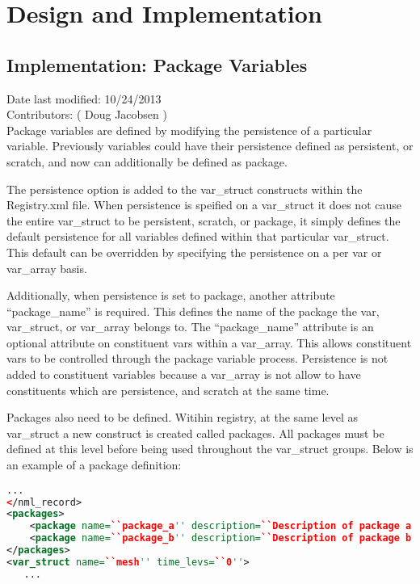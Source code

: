 \documentclass[11pt]{report}
\begin{document}

\chapter{Design and Implementation}
\section{Implementation: Package Variables}
Date last modified: 10/24/2013 \\
Contributors: ( Doug Jacobsen ) \\

Package variables are defined by modifying the persistence of a particular
variable. Previously variables could have their persistence defined as
persistent, or scratch, and now can additionally be defined as package.

The persistence option is added to the var\_struct constructs within the Registry.xml file. When persistence is
speified on a var\_struct it does not cause the entire var\_struct to be
persistent, scratch, or package, it simply defines the default persistence for
all variables defined within that particular var\_struct. This default can be
overridden by specifying the persistence on a per var or var\_array basis.

Additionally, when persistence is set to package, another attribute
``package\_name'' is required. This defines the name of the package the var,
var\_struct, or var\_array belongs to. The ``package\_name'' attribute is an
optional attribute on constituent vars within a var\_array. This allows
constituent vars to be controlled through the package variable process.
Persistence is not added to constituent variables because a var\_array is not
allow to have constituents which are persistence, and scratch at the same time.

Packages also need to be defined. Witihin registry, at the same level as
var\_struct a new construct is created called packages. All packages must be
defined at this level before being used throughout the var\_struct groups.
Below is an example of a package definition:

{\scriptsize
\begin{lstlisting}[language=XML]
   ...
</nml_record>
<packages>
	<package name=``package_a'' description=``Description of package a''/>
	<package name=``package_b'' description=``Description of package b''/>
</packages>
<var_struct name=``mesh'' time_levs=``0''>
   ...
\end{lstlisting}
}
\end{document}
